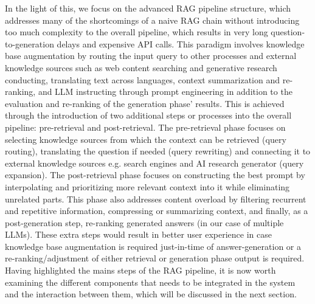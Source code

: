 In the light of this, we focus on the advanced RAG pipeline structure, which addresses many of the shortcomings of a naive RAG chain without introducing too much complexity to the overall pipeline, which results in very long question-to-generation delays and expensive API calls.
This paradigm involves knowledge base augmentation by routing the input query to other processes and external knowledge sources such as web content searching and generative research conducting, translating text across languages, context summarization and re-ranking, and LLM instructing through prompt engineering in addition to the evaluation and re-ranking of the generation phase' results. This is achieved through the introduction of two additional steps or processes into the overall pipeline: pre-retrieval and post-retrieval. The pre-retrieval phase focuses on selecting knowledge sources from which the context can be retrieved (query routing), translating the question if needed (query rewriting) and connecting it to external knowledge sources e.g. search engines and AI research generator (query expansion). The post-retrieval phase focuses on constructing the best prompt by interpolating and prioritizing more relevant context into it while eliminating unrelated parts. This phase also addresses content overload by filtering recurrent and repetitive information, compressing or summarizing context, and finally, as a post-generation step, re-ranking generated answers (in our case of multiple LLMs). These extra steps would result in better user experience in case knowledge base augmentation is required just-in-time of answer-generation or a re-ranking/adjustment of either retrieval or generation phase output is required.\bigskip\newline
Having highlighted the mains steps of the RAG pipeline, it is now worth examining the different components that needs to be integrated in the system and the interaction between them, which will be discussed in the next section.

